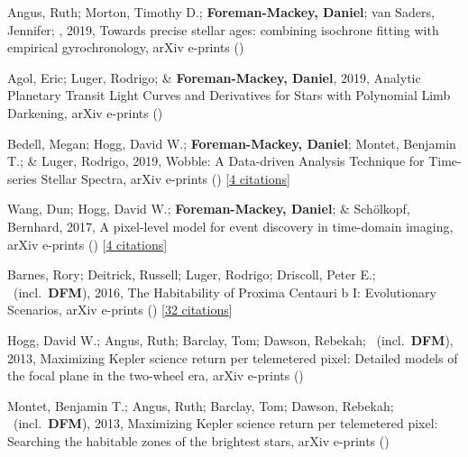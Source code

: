 \item[{\color{numcolor}\scriptsize7}] Angus, Ruth; Morton, Timothy D.; \textbf{Foreman-Mackey, Daniel}; van Saders, Jennifer; \etal, 2019, Towards precise stellar ages: combining isochrone fitting with empirical gyrochronology, arXiv e-prints ()

\item[{\color{numcolor}\scriptsize6}] Agol, Eric; Luger, Rodrigo; \& \textbf{Foreman-Mackey, Daniel}, 2019, Analytic Planetary Transit Light Curves and Derivatives for Stars with Polynomial Limb Darkening, arXiv e-prints ()

\item[{\color{numcolor}\scriptsize5}] Bedell, Megan; Hogg, David W.; \textbf{Foreman-Mackey, Daniel}; Montet, Benjamin T.; \& Luger, Rodrigo, 2019, Wobble: A Data-driven Analysis Technique for Time-series Stellar Spectra, arXiv e-prints () [\href{https://ui.adsabs.harvard.edu/abs/2019arXiv190100503B}{4 citations}]

\item[{\color{numcolor}\scriptsize4}] Wang, Dun; Hogg, David W.; \textbf{Foreman-Mackey, Daniel}; \& Sch{\"o}lkopf, Bernhard, 2017, A pixel-level model for event discovery in time-domain imaging, arXiv e-prints () [\href{https://ui.adsabs.harvard.edu/abs/2017arXiv171002428W}{4 citations}]

\item[{\color{numcolor}\scriptsize3}] Barnes, Rory; Deitrick, Russell; Luger, Rodrigo; Driscoll, Peter E.; \etal\ (incl.\ \textbf{DFM}), 2016, The Habitability of Proxima Centauri b I: Evolutionary Scenarios, arXiv e-prints () [\href{https://ui.adsabs.harvard.edu/abs/2016arXiv160806919B}{32 citations}]

\item[{\color{numcolor}\scriptsize2}] Hogg, David W.; Angus, Ruth; Barclay, Tom; Dawson, Rebekah; \etal\ (incl.\ \textbf{DFM}), 2013, Maximizing Kepler science return per telemetered pixel: Detailed models of the focal plane in the two-wheel era, arXiv e-prints ()

\item[{\color{numcolor}\scriptsize1}] Montet, Benjamin T.; Angus, Ruth; Barclay, Tom; Dawson, Rebekah; \etal\ (incl.\ \textbf{DFM}), 2013, Maximizing Kepler science return per telemetered pixel: Searching the habitable zones of the brightest stars, arXiv e-prints ()